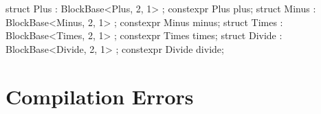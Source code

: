 \begin{cppcodenl}
  struct Plus : BlockBase<Plus, 2, 1> {};
  constexpr Plus plus;
  struct Minus : BlockBase<Minus, 2, 1> {};
  constexpr Minus minus;
  struct Times : BlockBase<Times, 2, 1> {};
  constexpr Times times;
  struct Divide : BlockBase<Divide, 2, 1> {};
  constexpr Divide divide;
\end{cppcodenl}

\section{Compilation Errors}
\label{sec:eda_errors}
